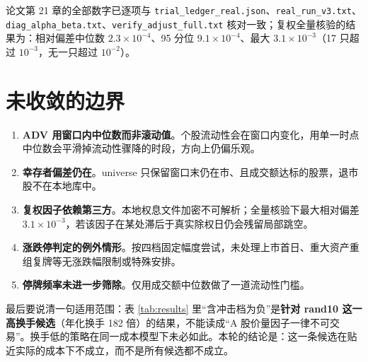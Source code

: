 \documentclass[11pt,a4paper]{ctexart}
\begin{document}
论文第 21 章的全部数字已逐项与 \texttt{trial\_ledger\_real.json}、\texttt{real\_run\_v3.txt}、\texttt{diag\_alpha\_beta.txt}、\texttt{verify\_adjust\_full.txt} 核对一致；复权全量核验的结果为：相对偏差中位数 $2.3\times10^{-4}$、95 分位 $9.1\times10^{-4}$、最大 $3.1\times10^{-3}$（17 只超过 $10^{-3}$，无一只超过 $10^{-2}$）。

\section{未收敛的边界}

\begin{enumerate}
  \item \textbf{ADV 用窗口内中位数而非滚动值}。个股流动性会在窗口内变化，用单一时点中位数会平滑掉流动性骤降的时段，方向上仍偏乐观。
  \item \textbf{幸存者偏差仍在}。universe 只保留窗口末仍在市、且成交额达标的股票，退市股不在本地库中。
  \item \textbf{复权因子依赖第三方}。本地权息文件加密不可解析；全量核验下最大相对偏差 $3.1\times10^{-3}$，若该因子在某处滞后于真实除权日仍会残留局部跳空。
  \item \textbf{涨跌停判定的例外情形}。按四档固定幅度尝试，未处理上市首日、重大资产重组复牌等无涨跌幅限制或特殊安排。
  \item \textbf{停牌频率未进一步筛除}。仅用成交额中位数做了一道流动性门槛。
\end{enumerate}

最后要说清一句适用范围：表 \ref{tab:results} 里“含冲击档为负”是\textbf{针对 rand10 这一高换手候选}（年化换手 182 倍）的结果，不能读成“A 股价量因子一律不可交易”。换手低的策略在同一成本模型下未必如此。本轮的结论是：这一条候选在贴近实际的成本下不成立，而不是所有候选都不成立。
\end{document}
